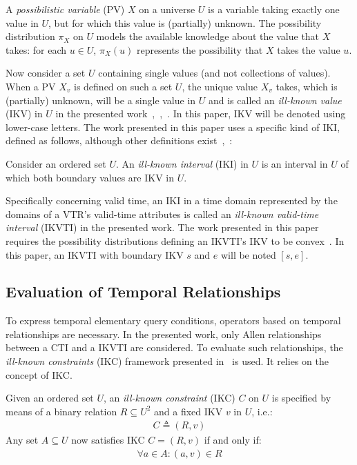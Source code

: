 \documentclass[runningheads,a4paper]{llncs}
\begin{document}
\begin{definition}
\label{def:poss-variable}
A \emph{possibilistic variable} (PV) $X$ on a universe $U$ is a variable taking exactly one value in $U$, but for which this value is (partially) unknown. The possibility distribution $\pi_X$ on $U$ models the available knowledge about the value that $X$ takes: for each $u \in U$, $\pi_X(u)$ represents the possibility that $X$ takes the value $u$.
\end{definition}

Now consider a set $U$ containing single values (and not collections of values). When a PV $X_{v}$ is defined on such a set $U$, the unique value $X_{v}$ takes, which is (partially) unknown, will be a single value in $U$ and is called an \emph{ill-known value} (IKV) in $U$ in the presented work~\cite{Dubois1988cma},~\cite{Pons2013ijufkbs},~\cite{Billiet2012ipmu}. In this paper, IKV will be denoted using lower-case letters. The work presented in this paper uses a specific kind of IKI, defined as follows, although other definitions exist~\cite{Pons2012ipmu},~\cite{Billiet2012ipmu}:

\begin{definition}
Consider an ordered set $U$. An \emph{ill-known interval} (IKI) in $U$ is an interval in $U$ of which both boundary values are IKV in $U$.
\end{definition}

Specifically concerning valid time, an IKI in a time domain represented by the domains of a VTR's valid-time attributes is called an \emph{ill-known valid-time interval} (IKVTI) in the presented work. The work presented in this paper requires the possibility distributions defining an IKVTI's IKV to be convex~\cite{Pons2013ijufkbs}. In this paper, an IKVTI with boundary IKV $s$ and $e$ will be noted $\left[s, e\right]$.

\subsection{Evaluation of Temporal Relationships}
To express temporal elementary query conditions, operators based on temporal relationships are necessary. In the presented work, only Allen relationships~\cite{Allen1983cacm} between a CTI and a IKVTI are considered. To evaluate such relationships, the \emph{ill-known constraints} (IKC) framework presented in~\cite{Pons2013ijufkbs} is used. It relies on the concept of IKC.

\begin{definition}
Given an ordered set $U$, an \emph{ill-known constraint} (IKC) $C$ on $U$ is specified by means of a binary relation $R \subseteq U^{2}$ and a fixed IKV $v$ in $U$, i.e.:
\begin{align}
C \triangleq (R,v) \nonumber
\end{align}
Any set $A \subseteq U$ now satisfies IKC $C = (R,v)$ if and only if:
\begin{align}
\forall a \in A : (a,v) \in R \nonumber
\end{align}
\end{definition}
\end{document}
